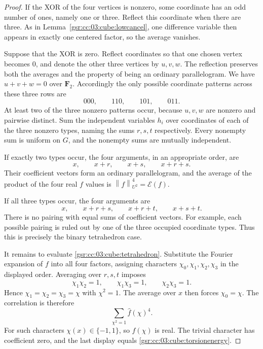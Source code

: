 \documentclass[11pt,letterpaper]{article}
\numberwithin{equation}{section}
\theoremstyle{definition}
\theoremstyle{remark}
\newcommand{\1}{\mathbf 1}
\newcommand{\norm}[1]{\left\|#1\right\|}
\begin{document}
\begin{proof}
If the XOR of the four vertices is nonzero, some coordinate has an odd
number of ones, namely one or three.  Reflect this coordinate when
there are three.  As in Lemma~\ref{gsr:cc:03:cube:lowcancel}, one difference
variable then appears in exactly one centered factor, so the average
vanishes.

Suppose that the XOR is zero.  Reflect coordinates so that one chosen
vertex becomes $0$, and denote the other three vertices by $u,v,w$.
The reflection preserves both the averages and the property of being
an ordinary parallelogram.  We have $u+v+w=0$ over $\mathbf F_2$.
Accordingly the only possible coordinate patterns across these three
rows are
\[
 000,\qquad110,\qquad101,\qquad011.
\]
At least two of the three nonzero patterns occur, because $u,v,w$ are
nonzero and pairwise distinct.  Sum the independent variables $h_i$
over coordinates of each of the three nonzero types, naming the sums
$r,s,t$ respectively.  Every nonempty sum is uniform on $G$, and the
nonempty sums are mutually independent.

If exactly two types occur, the four arguments, in an appropriate
order, are
\[
 x,\qquad x+r,\qquad x+s,\qquad x+r+s.
\]
Their coefficient vectors form an ordinary parallelogram, and the
average of the product of the four real $f$ values is
$\norm f_{U^2}^4=\mathcal E(f)$.

If all three types occur, the four arguments are
\begin{equation}
 x,\qquad x+r+s,\qquad x+r+t,\qquad x+s+t.
 \label{gsr:cc:03:cube:tetrahedron}
\end{equation}
There is no pairing with equal sums of coefficient vectors.  For
example, each possible pairing is ruled out by one of the three
occupied coordinate types.  Thus this is precisely the binary
tetrahedron case.

It remains to evaluate \eqref{gsr:cc:03:cube:tetrahedron}.  Substitute the Fourier
expansion of $f$ into all four factors, assigning characters
$\chi_0,\chi_1,\chi_2,\chi_3$ in the displayed order.  Averaging over
$r,s,t$ imposes
\[
 \chi_1\chi_2=1,\qquad
 \chi_1\chi_3=1,\qquad
 \chi_2\chi_3=1.
\]
Hence $\chi_1=\chi_2=\chi_3=\chi$ with $\chi^2=1$.
The average over $x$ then forces $\chi_0=\chi$.  The correlation is
therefore
\[
 \sum_{\chi^2=1}\widehat f(\chi)^4.
\]
For such characters $\chi(x)\in\{-1,1\}$, so $\widehat f(\chi)$ is
real.  The trivial character has coefficient zero, and the last
display equals \eqref{gsr:cc:03:cube:torsionenergy}.
\end{proof}
\end{document}
